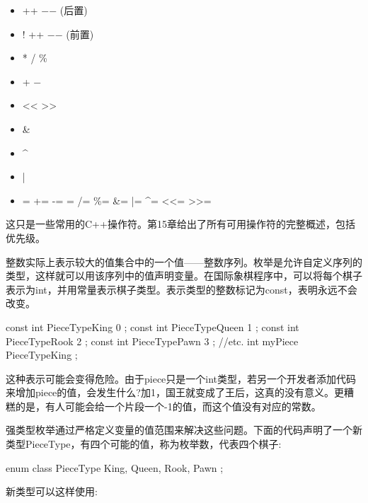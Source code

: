 \begin{itemize}
\item
++ \enspace −{}− (后置)

\item
! \enspace ++ \enspace −{}− (前置)

\item
* \enspace / \enspace \%

\item
+ \enspace −

\item
<{}< \enspace >{}>

\item
\&

\item
\textasciicircum

\item
|

\item
= \enspace += \enspace -= \enspace *= \enspace /= \enspace \%= \enspace \&= \enspace |= \enspace \textasciicircum= \enspace <{}<= \enspace >{}>=

\end{itemize}

这只是一些常用的C++操作符。第15章给出了所有可用操作符的完整概述，包括优先级。


整数实际上表示较大的值集合中的一个值——整数序列。枚举是允许自定义序列的类型，这样就可以用该序列中的值声明变量。在国际象棋程序中，可以将每个棋子表示为int，并用常量表示棋子类型。表示类型的整数标记为const，表明永远不会改变。

\begin{cpp}
const int PieceTypeKing { 0 };
const int PieceTypeQueen { 1 };
const int PieceTypeRook { 2 };
const int PieceTypePawn { 3 };
//etc.
int myPiece { PieceTypeKing };
\end{cpp}

这种表示可能会变得危险。由于piece只是一个int类型，若另一个开发者添加代码来增加piece的值，会发生什么?加1，国王就变成了王后，这真的没有意义。更糟糕的是，有人可能会给一个片段一个-1的值，而这个值没有对应的常数。

强类型枚举通过严格定义变量的值范围来解决这些问题。下面的代码声明了一个新类型PieceType，有四个可能的值，称为枚举数，代表四个棋子:

\begin{cpp}
enum class PieceType { King, Queen, Rook, Pawn };
\end{cpp}

新类型可以这样使用:

